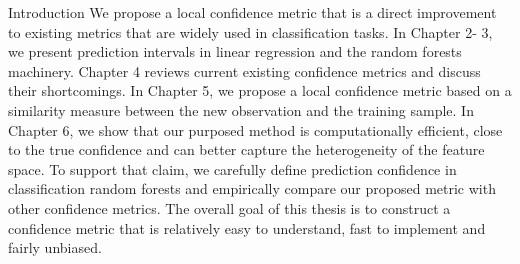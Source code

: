 \documentclass[12pt]{pom_thesis}
\begin{document}
\begin{chapter}{Introduction}
We propose a local confidence metric that is a direct improvement to existing metrics that are widely used in classification tasks. In Chapter 2- 3, we present prediction intervals in linear regression and the random forests machinery. Chapter 4 reviews current existing confidence metrics and discuss their shortcomings. In Chapter 5, we propose a local confidence metric based on a similarity measure between the new observation and the training sample. In Chapter 6, we show that our purposed method is computationally efficient, close to the true confidence and can better capture the heterogeneity of the feature space. To support that claim, we carefully define prediction confidence in classification random forests and empirically compare our proposed metric with other confidence metrics. The overall goal of this thesis is to construct a confidence metric that is relatively easy to understand, fast to implement and fairly unbiased. 



\end{chapter}

\end{document}
